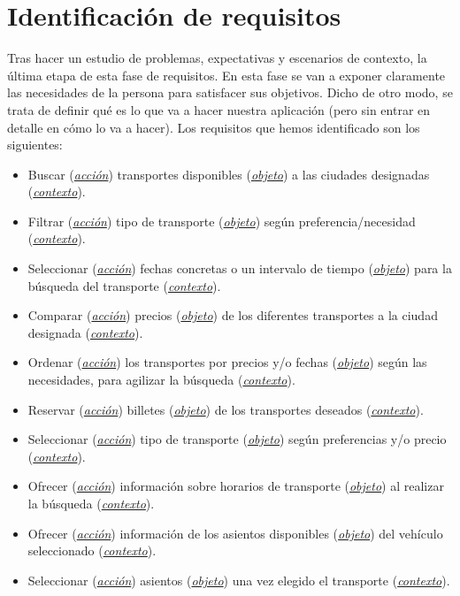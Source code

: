 \section{Identificación de requisitos}
Tras hacer un estudio de problemas, expectativas y escenarios de contexto, la última etapa de esta fase de requisitos. En esta fase se van a exponer claramente las 
necesidades de la persona para satisfacer sus objetivos. Dicho de otro modo, se trata de definir qué es lo que va a hacer nuestra aplicación (pero sin entrar en
detalle en cómo lo va a hacer). Los requisitos que hemos identificado son los siguientes:
\begin{itemize}
    \item Buscar (\textit{\underline{acción}}) transportes disponibles (\textit{\underline{objeto}}) a las ciudades designadas (\textit{\underline{contexto}}).
    \item Filtrar (\textit{\underline{acción}}) tipo de transporte (\textit{\underline{objeto}}) según preferencia/necesidad (\textit{\underline{contexto}}).
    \item Seleccionar (\textit{\underline{acción}}) fechas concretas o un intervalo de tiempo (\textit{\underline{objeto}}) para la búsqueda del transporte (\textit{\underline{contexto}}).
    \item Comparar (\textit{\underline{acción}}) precios (\textit{\underline{objeto}}) de los diferentes transportes a la ciudad designada (\textit{\underline{contexto}}).
    \item Ordenar (\textit{\underline{acción}}) los transportes por precios y/o fechas (\textit{\underline{objeto}}) según las necesidades, para agilizar la búsqueda (\textit{\underline{contexto}}).
    \item Reservar (\textit{\underline{acción}}) billetes (\textit{\underline{objeto}}) de los transportes deseados (\textit{\underline{contexto}}).
    \item Seleccionar (\textit{\underline{acción}}) tipo de transporte (\textit{\underline{objeto}}) según preferencias y/o precio (\textit{\underline{contexto}}).
    \item Ofrecer (\textit{\underline{acción}}) información sobre horarios de transporte (\textit{\underline{objeto}}) al realizar la búsqueda (\textit{\underline{contexto}}).
    \item Ofrecer (\textit{\underline{acción}}) información de los asientos disponibles (\textit{\underline{objeto}}) del vehículo seleccionado (\textit{\underline{contexto}}).
    \item Seleccionar (\textit{\underline{acción}}) asientos (\textit{\underline{objeto}}) una vez elegido el transporte (\textit{\underline{contexto}}).

\end{itemize}
